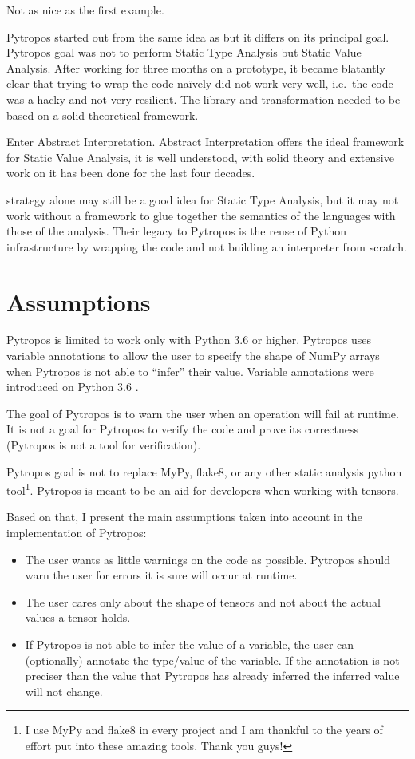 Not as nice as the first example.

Pytropos started out from the same idea as \textcite{ortin_towards_2015}
but it differs on its principal goal. Pytropos goal was not to perform
Static Type Analysis but Static Value Analysis. After working for three
months on a prototype, it became blatantly clear that trying to wrap the
code naïvely did not work very well, i.e.~the code was a hacky and not
very resilient. The library and transformation needed to be based on a
solid theoretical framework.

Enter Abstract Interpretation. Abstract Interpretation offers the ideal
framework for Static Value Analysis, it is well understood, with solid
theory and extensive work on it has been done for the last four decades.

\textcite{ortin_towards_2015} strategy alone may still be a good idea
for Static Type Analysis, but it may not work without a framework to
glue together the semantics of the languages with those of the analysis.
Their legacy to Pytropos is the reuse of Python infrastructure by
wrapping the code and not building an interpreter from scratch.

\section{Assumptions}\label{assumptions}

Pytropos is limited to work only with Python 3.6 or higher. Pytropos
uses variable annotations to allow the user to specify the shape of
NumPy arrays when Pytropos is not able to \enquote{infer} their value.
Variable annotations were introduced on Python 3.6 \autocite{pep526}.

The goal of Pytropos is to warn the user when an operation will fail at
runtime. It is not a goal for Pytropos to verify the code and prove its
correctness (Pytropos is not a tool for verification).

Pytropos goal is not to replace MyPy, flake8, or any other static
analysis python tool\footnote{I use MyPy and flake8 in every project and
  I am thankful to the years of effort put into these amazing tools.
  Thank you guys!}. Pytropos is meant to be an aid for developers when
working with tensors.

Based on that, I present the main assumptions taken into account in the
implementation of Pytropos:

\begin{itemize}
\tightlist
\item
  The user wants as little warnings on the code as possible. Pytropos
  should warn the user for errors it is sure will occur at runtime.
\item
  The user cares only about the shape of tensors and not about the
  actual values a tensor holds.
\item
  If Pytropos is not able to infer the value of a variable, the user can
  (optionally) annotate the type/value of the variable. If the
  annotation is not preciser than the value that Pytropos has already
  inferred the inferred value will not change.
\end{itemize}

